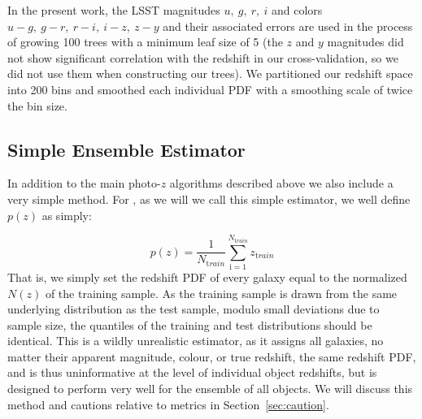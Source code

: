 In the present work, the LSST magnitudes $u,~g,~r,~i$ and colors $u-g,~g-r,~r-i,~i-z,~z-y$ and their associated errors are used in the process of growing 100 trees with a minimum leaf size of 5 (the $z$ and $y$ magnitudes did not show significant correlation with the redshift in our cross-validation, so we did not use them when constructing our trees). We partitioned our redshift space into 200 bins and smoothed each individual PDF with a smoothing scale of twice the bin size.
\subsection{Simple Ensemble Estimator}\label{sec:method:trainz}
In addition to the main photo-$z$ algorithms described above we also include a very simple method.  For \trainz, as we will we call this simple estimator, we well define $p(z)$ as simply:

\begin{equation}
p(z) = \frac{1}{N_{ \mathrm train}}\sum_{\mathrm i=1}^{N_{\mathrm train}}z_{\mathrm train}
\end{equation}
That is, we simply set the redshift PDF of every galaxy equal to the normalized $N(z)$ of the training sample.  As the training sample is drawn from the same underlying distribution as the test sample, modulo small deviations due to sample size, the quantiles of the training and test distributions should be identical.  This is a wildly unrealistic estimator, as it assigns all galaxies, no matter their apparent magnitude, colour, or true redshift, the same redshift PDF, and is thus uninformative at the level of individual object redshifts, but is designed to perform very well for the ensemble of all objects.  We will discuss this method and cautions relative to metrics in Section~\ref{sec:caution}.
